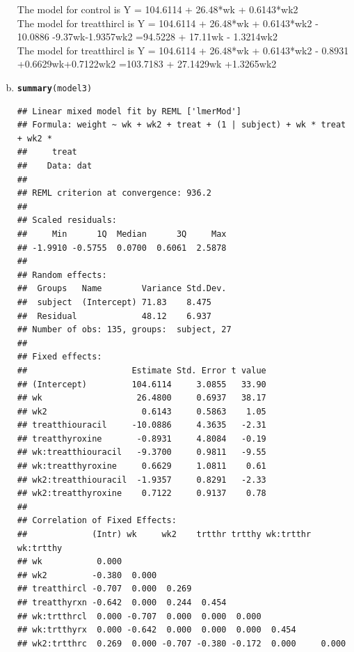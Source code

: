 \documentclass{article}\usepackage[]{graphicx}\usepackage[]{color}
\makeatletter
\newcommand{\hlstd}[1]{\textcolor[rgb]{0.345,0.345,0.345}{#1}}%
\newcommand{\hlkwd}[1]{\textcolor[rgb]{0.737,0.353,0.396}{\textbf{#1}}}%
\newenvironment{kframe}{%
 \def\at@end@of@kframe{}%
 \ifinner\ifhmode%
  \def\at@end@of@kframe{\end{minipage}}%
  \begin{minipage}{\columnwidth}%
 \fi\fi%
 \def\FrameCommand##1{\hskip\@totalleftmargin \hskip-\fboxsep
 \colorbox{shadecolor}{##1}\hskip-\fboxsep
     \hskip-\linewidth \hskip-\@totalleftmargin \hskip\columnwidth}%
 \MakeFramed {\advance\hsize-\width
   \@totalleftmargin\z@ \linewidth\hsize
   \@setminipage}}%
 {\par\unskip\endMakeFramed%
 \at@end@of@kframe}
\newenvironment{knitrout}{}{} %
\makeatother
\begin{document}
\begin{enumerate}[(a)]
\qquad The model for control is Y = 104.6114 + 26.48*wk + 0.6143*wk2  \\
\qquad The model for treatthircl is Y = 104.6114 + 26.48*wk + 0.6143*wk2  - 10.0886 -9.37wk-1.9357wk2 =94.5228 + 17.11wk - 1.3214wk2 \\
\qquad The model for treatthircl is Y = 104.6114 + 26.48*wk + 0.6143*wk2  - 0.8931 +0.6629wk+0.7122wk2 =103.7183 + 27.1429wk +1.3265wk2 \\

\item

\begin{knitrout}
\color{fgcolor}\begin{kframe}
\begin{alltt}
  \hlkwd{summary}\hlstd{(model3)}
\end{alltt}
\begin{verbatim}
## Linear mixed model fit by REML ['lmerMod']
## Formula: weight ~ wk + wk2 + treat + (1 | subject) + wk * treat + wk2 *  
##     treat
##    Data: dat
## 
## REML criterion at convergence: 936.2
## 
## Scaled residuals: 
##     Min      1Q  Median      3Q     Max 
## -1.9910 -0.5755  0.0700  0.6061  2.5878 
## 
## Random effects:
##  Groups   Name        Variance Std.Dev.
##  subject  (Intercept) 71.83    8.475   
##  Residual             48.12    6.937   
## Number of obs: 135, groups:  subject, 27
## 
## Fixed effects:
##                     Estimate Std. Error t value
## (Intercept)         104.6114     3.0855   33.90
## wk                   26.4800     0.6937   38.17
## wk2                   0.6143     0.5863    1.05
## treatthiouracil     -10.0886     4.3635   -2.31
## treatthyroxine       -0.8931     4.8084   -0.19
## wk:treatthiouracil   -9.3700     0.9811   -9.55
## wk:treatthyroxine     0.6629     1.0811    0.61
## wk2:treatthiouracil  -1.9357     0.8291   -2.33
## wk2:treatthyroxine    0.7122     0.9137    0.78
## 
## Correlation of Fixed Effects:
##             (Intr) wk     wk2    trtthr trtthy wk:trtthr wk:trtthy
## wk           0.000                                                
## wk2         -0.380  0.000                                         
## treatthircl -0.707  0.000  0.269                                  
## treatthyrxn -0.642  0.000  0.244  0.454                           
## wk:trtthrcl  0.000 -0.707  0.000  0.000  0.000                    
## wk:trtthyrx  0.000 -0.642  0.000  0.000  0.000  0.454             
## wk2:trtthrc  0.269  0.000 -0.707 -0.380 -0.172  0.000     0.000   

\end{verbatim}
\end{kframe}
\end{knitrout}
\end{enumerate}
\end{document}
